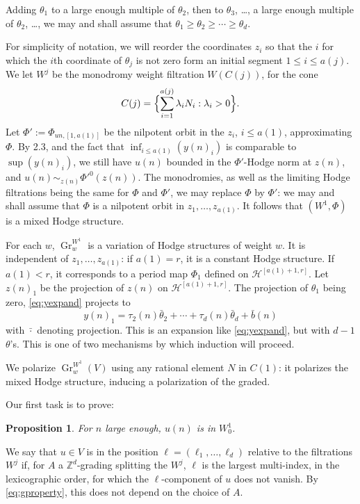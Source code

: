 \documentclass[11pt,a4paper]{article}
\theoremstyle{plain}
\newtheorem{proposition}[theorem]{Proposition}
\theoremstyle{definition}
\DeclareMathOperator{\Gr}{Gr}
\begin{document}
Adding $\theta_1$ to a large enough multiple of $\theta_2$, then to $\theta_3$, \dots, a large enough multiple of $\theta_2$, \dots, we may and shall assume that $\theta_1\geq\theta_2\geq\cdots\geq\theta_d$.

For simplicity of notation, we will reorder the coordinates $z_i$ so that the $i$ for which the $i$th coordinate of $\theta_j$ is not zero form an initial segment $1\leq i\leq a(j)$. We let $W^j$ be the monodromy weight filtration $W(C(j))$, for the cone
\[
C(j)=\Bigl\{\sum_{i=1}^{a(j)}\lambda_i N_i:\lambda_i>0\Bigr\}.
\]
Let $\Phi':=\Phi_{un,[1,a(1)]}$ be the nilpotent orbit in the $z_i$, $i\leq a(1)$, approximating $\Phi$. By 2.3, and the fact that $\inf_{i\leq a(1)}(y(n)_i)$ is comparable to $\sup(y(n)_i)$, we still have $u(n)$ bounded in the $\Phi'$-Hodge norm at $z(n)$, and $u(n)\sim_{z(n)}\Phi'^0(z(n))$. The monodromies, as well as the limiting Hodge filtrations being the same for $\Phi$ and $\Phi'$, we may replace $\Phi$ by $\Phi'$: we may and shall assume that $\Phi$ is a nilpotent orbit in $z_1,\dots,z_{a(1)}$. It follows that $(W^1,\Phi)$ is a mixed Hodge structure.

For each $w$, $\Gr_w^{W^1}$ is a variation of Hodge structures of weight $w$. It is independent of $z_1,\dots,z_{a(1)}$: if $a(1)=r$, it is a constant Hodge structure. If $a(1)<r$, it corresponds to a period map $\Phi_1$ defined on $\mathcal{H}^{[a(1)+1,r]}$. Let $z(n)_1$ be the projection of $z(n)$ on $\mathcal{H}^{[a(1)+1,r]}$. The projection of $\theta_1$ being zero, \eqref{eq:yexpand} projects to
\begin{equation}\label{eq:yproj}
y(n)_1=\tau_2(n)\bar{\theta}_2+\cdots+\tau_d(n)\bar{\theta}_d+\bar{b}(n)
\end{equation}
with $\bar{\cdot}$ denoting projection. This is an expansion like \eqref{eq:yexpand}, but with $d-1$ $\theta$'s. This is one of two mechanisms by which induction will proceed.

We polarize $\Gr_w^{W^1}(V)$ using any rational element $N$ in $C(1)$: it polarizes the mixed Hodge structure, inducing a polarization of the graded.

Our first task is to prove:

\begin{proposition}\label{prop:inW}
For $n$ large enough, $u(n)$ is in $W^1_0$.
\end{proposition}

We say that $u\in V$ is in the position $\ell=(\ell_1,\dots,\ell_d)$ relative to the filtrations $W^j$ if, for $A$ a $\mathbb{Z}^d$-grading splitting the $W^j$, $\ell$ is the largest multi-index, in the lexicographic order, for which the $\ell$-component of $u$ does not vanish. By \eqref{eq:gproperty}, this does not depend on the choice of $A$.
\end{document}
